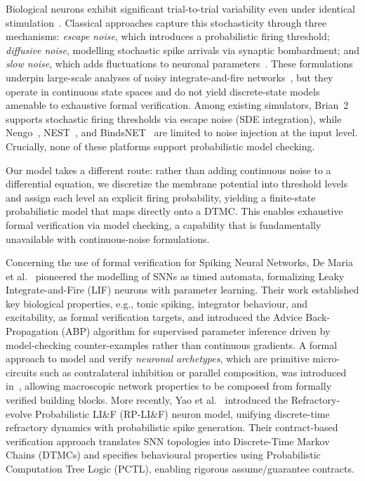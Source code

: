 \documentclass[runningheads]{llncs}
\begin{document}
Biological neurons exhibit significant trial-to-trial variability even under
identical stimulation~\cite{gerstner2002spiking}. Classical approaches capture
this stochasticity through three mechanisms: \emph{escape noise}, which
introduces a probabilistic firing threshold; \emph{diffusive noise}, modelling
stochastic spike arrivals via synaptic bombardment; and \emph{slow noise}, which
adds fluctuations to neuronal parameters~\cite{gerstner2002spiking}. These
formulations underpin large-scale analyses of noisy integrate-and-fire
networks~\cite{brunel1999fast}, but they operate in continuous state spaces and
do not yield discrete-state models amenable to exhaustive formal verification.
Among existing simulators, Brian~2~\cite{stimberg2019brian2} supports stochastic
firing thresholds via escape noise (SDE integration), while
Nengo~\cite{bekolay2014nengo}, NEST~\cite{gewaltig2007nest}, and
BindsNET~\cite{hazan2018bindsnet} are limited to noise injection at the input
level. Crucially, none of these platforms support probabilistic model checking.

Our model takes a different route: rather than adding continuous noise to a
differential equation, we discretize the membrane potential into threshold
levels and assign each level an explicit firing probability, yielding a
finite-state probabilistic model that maps directly onto a DTMC. This enables
exhaustive formal verification via model checking, a capability that is
fundamentally unavailable with continuous-noise formulations.

Concerning the use of formal verification for Spiking Neural Networks, De Maria
et al.~\cite{naco20} pioneered the modelling of SNNs as timed automata,
formalizing Leaky Integrate-and-Fire (LIF) neurons with parameter learning.
Their work established key biological properties, e.g., tonic spiking,
integrator behaviour, and excitability, as formal verification targets, and
introduced the Advice Back-Propagation (ABP) algorithm for supervised parameter
inference driven by model-checking counter-examples rather than continuous
gradients. A formal approach to model and verify \emph{neuronal archetypes},
which are primitive micro-circuits such as contralateral inhibition or parallel
composition, was introduced in~\cite{demaria2022formal}, allowing macroscopic
network properties to be composed from formally verified building blocks. More
recently, Yao et al.~\cite{yao2025probabilistic} introduced the
Refractory-evolve Probabilistic LI\&F (RP-LI\&F) neuron model, unifying
discrete-time refractory dynamics with probabilistic spike generation. Their
contract-based verification approach translates SNN topologies into
Discrete-Time Markov Chains (DTMCs) and specifies behavioural properties using
Probabilistic Computation Tree Logic (PCTL), enabling rigorous assume/guarantee
contracts.
\end{document}
